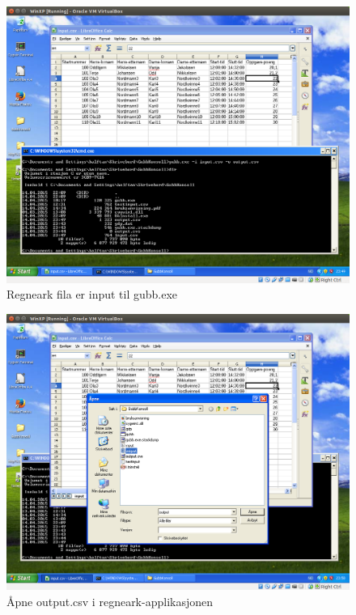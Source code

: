 \documentclass[12pt]{book}
\begin{document}
\begin{figure}[h]
\includegraphics[width=15cm]{014}
\caption{Regneark fila er input til gubb.exe}
\end{figure}

\begin{figure}[h]
\includegraphics[width=15cm]{015}
\caption{Åpne output.csv i regneark-applikasjonen}
\end{figure}
\end{document}
